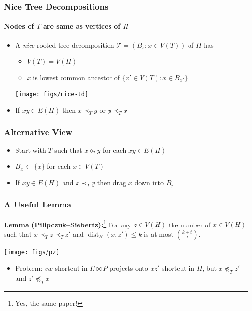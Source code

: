 \documentclass[xcolor=dvipsnames]{beamer}
\begin{document}
\begin{frame}
  \frametitle{Nice Tree Decompositions}
  \framesubtitle{Nodes of $T$ are same as vertices of $H$}


  \begin{itemize}
    \item A \emph{nice} rooted tree decomposition $\mathcal{T}=(B_x:x\in V(T))$ of $H$ has
    \begin{itemize}
      \item $V(T) = V(H)$
      \item $x$ is lowest common ancestor of $\{x'\in V(T):x\in B_{x'}\}$
    \end{itemize}
    \begin{center}
      \texttt{[image: figs/nice-td]}
    \end{center}
    \item If $xy\in E(H)$ then $x\prec_T y$ or $y\prec_T x$
  \end{itemize}
\end{frame}


\begin{frame}
  \frametitle{Alternative View}

  \begin{itemize}
    \item<1-> Start with $T$ such that $x\mathbin{\diamond}_T y$ for each $xy\in E(H)$
    \item<2-> $B_x\gets\{x\}$ for each $x\in V(T)$
    \item<3-> If $xy\in E(H)$ and $x\prec_T y$ then drag $x$ down into $B_y$
  \end{itemize}
  \begin{center}
  \end{center}
\end{frame}


\begin{frame}
  \frametitle{A Useful Lemma}

  \textbf{Lemma (Pilipczuk--Siebertz):}\footnote{Yes, the same paper!} For any $z\in V(H)$ the number of $x\in V(H)$ such that $x\prec_T z\prec_T z'$ and $\mathop{dist}_H(x,z')\le k$ is at most $\binom{k+t}{t}$.
  \begin{center}
    \texttt{[image: figs/pz]}%
  \end{center}
  \begin{itemize}
      \item<2->Problem: $vw$-shortcut in $H\boxtimes P$ projects onto $xz'$ shortcut in $H$, but $x\not\preceq_T z'$ and $z'\not\preceq_T x$
  \end{itemize}
\end{frame}
\end{document}
